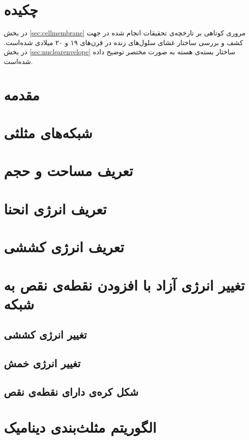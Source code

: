 \setRL
\clearpage
\def \MemDiscr {\Mempath /MembraneDiscrete}

\section{
چکیده
}
در بخش
\ref{sec:cellmembrane}
مروری کوتاهی بر تارخچه‌ی تحقیقات انجام شده در جهت کشف و بررسی ساختار غشای سلول‌های زنده در قرن‌های ۱۹ و ۲۰ میلادی شده‌است. در بخش
\ref{sec:nuclearenvelope}
ساختار بسته‌ی هسته به صورت مختصر توضیح داده شده‌است.

\section{
مقدمه
}



\section{
شبکه‌های مثلثی
}



\section{
تعریف مساحت و حجم
}



\section{
تعریف انرژی انحنا
}



\section{
تعریف انرژی کششی
}


\section{
تغییر انرژی آزاد با افزودن نقطەی نقص به شبکه
}
\subsection{
تغییر انرژی کششی
}

\subsection{
تغییر انرژی خمش
}

\subsection{
شکل کره‌ی دارای نقطه‌ی نقص
}


\section{
الگوریتم مثلث‌بندی دینامیک
}





